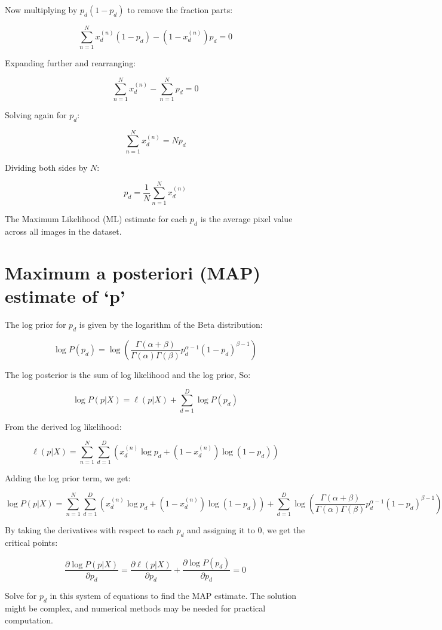 \documentclass{article}
\begin{document}
Now multiplying by \( p_d(1 - p_d) \) to remove the fraction parts:

\[ \sum_{n=1}^{N} x_d^{(n)}(1 - p_d) - (1 - x_d^{(n)})p_d = 0 \]

Expanding further and rearranging:

\[ \sum_{n=1}^{N} x_d^{(n)} - \sum_{n=1}^{N} p_d = 0 \]

Solving again for \( p_d \):

\[ \sum_{n=1}^{N} x_d^{(n)} = Np_d \]

Dividing both sides by \( N \):

\[ p_d = \frac{1}{N} \sum_{n=1}^{N} x_d^{(n)} \]

The Maximum Likelihood (ML) estimate for each \( p_d \) is the average pixel value across all images in the dataset.

\section{Maximum a posteriori (MAP) estimate of `p'}

The log prior for \( p_d \) is given by the logarithm of the Beta distribution:

\[ \log P(p_d) = \log \left( \frac{\Gamma(\alpha + \beta)}{\Gamma(\alpha)\Gamma(\beta)} p_d^{\alpha - 1} (1 - p_d)^{\beta - 1} \right) \]

The log posterior is the sum of log likelihood and the log prior, So:

\[ \log P(p | X) = \ell(p | X) + \sum_{d=1}^{D} \log P(p_d) \]

From the derived log likelihood:

\[ \ell(p | X) = \sum_{n=1}^{N} \sum_{d=1}^{D} \left( x_d^{(n)} \log p_d + (1 - x_d^{(n)}) \log (1 - p_d) \right) \]

Adding the log prior term, we get:

\[ \log P(p | X) = \sum_{n=1}^{N} \sum_{d=1}^{D} \left( x_d^{(n)} \log p_d + (1 - x_d^{(n)}) \log (1 - p_d) \right) + \sum_{d=1}^{D} \log \left( \frac{\Gamma(\alpha + \beta)}{\Gamma(\alpha)\Gamma(\beta)} p_d^{\alpha - 1} (1 - p_d)^{\beta - 1} \right) \]

By taking the derivatives with respect to each \( p_d \) and assigning it to 0, we get the critical points:

\[ \frac{\partial \log P(p | X)}{\partial p_d} = \frac{\partial \ell(p | X)}{\partial p_d} + \frac{\partial \log P(p_d)}{\partial p_d} = 0 \]

Solve for \( p_d \) in this system of equations to find the MAP estimate. The solution might be complex, and numerical methods may be needed for practical computation.\\
\end{document}
